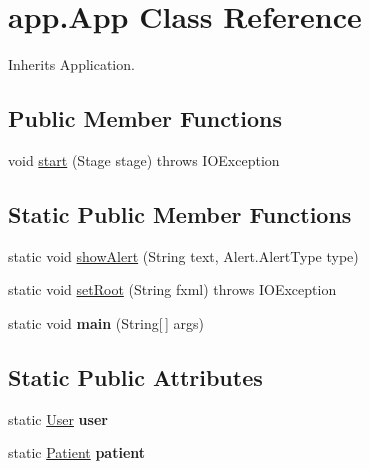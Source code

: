 \hypertarget{classapp_1_1_app}{}\section{app.\+App Class Reference}
\label{classapp_1_1_app}


Inherits Application.

\subsection*{Public Member Functions}
\begin{DoxyCompactItemize}
\item 
void \mbox{\hyperlink{classapp_1_1_app_a00c8fa7be9652a98d9663d7e89e4e6a3}{start}} (Stage stage)  throws I\+O\+Exception 
\end{DoxyCompactItemize}
\subsection*{Static Public Member Functions}
\begin{DoxyCompactItemize}
\item 
static void \mbox{\hyperlink{classapp_1_1_app_a2fe1147fd5157293f36f43ef710f9612}{show\+Alert}} (String text, Alert.\+Alert\+Type type)
\item 
static void \mbox{\hyperlink{classapp_1_1_app_a4e35071c95df2c529a8d236b7a802dcf}{set\+Root}} (String fxml)  throws I\+O\+Exception 
\item 
\mbox{\label{classapp_1_1_app_ae4388e48278141dcf19c5a599d702a4c}} 
static void {\bfseries main} (String\mbox{[}$\,$\mbox{]} args)
\end{DoxyCompactItemize}
\subsection*{Static Public Attributes}
\begin{DoxyCompactItemize}
\item 
\mbox{\label{classapp_1_1_app_a6df3e832d9babdf40d2ce5d70c1c3a19}} 
static \mbox{\hyperlink{classapp_1_1entity_1_1_user}{User}} {\bfseries user}
\item 
\mbox{\label{classapp_1_1_app_af353918eccd65a1fbfaeff88726f0b5d}} 
static \mbox{\hyperlink{classapp_1_1entity_1_1_patient}{Patient}} {\bfseries patient}
\end{DoxyCompactItemize}


